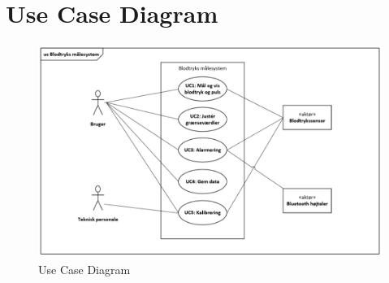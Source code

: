 \section{Use Case Diagram}
\vspace{0.5 cm}
\begin{figure}[h!]
	\centering
	\includegraphics[width=0.75\linewidth]{FunktionelleKrav/Diagram}
	\caption{Use Case Diagram}
	\label{fig:Use_case_diagram}
\end{figure}